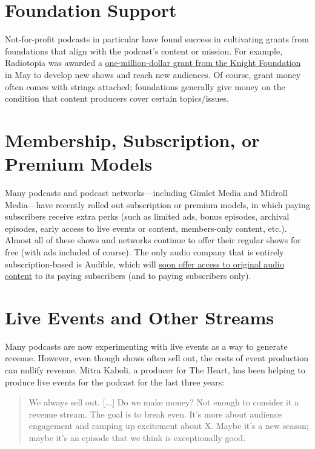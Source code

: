 \documentclass[notoc, symmetric, nobib, nols]{towcenter-guideto-book}
\begin{document}
\section{Foundation Support}
Not-for-profit podcasts in particular have found success in cultivating grants from foundations that align with the podcast's content or mission. For example, Radiotopia was awarded a \href{http://www.niemanlab.org/2015/05/knight-foundation-invests-1-million-in-creator-driven-podcast-collective-radiotopia/}{one-million-dollar grant from the Knight Foundation} in May to develop new shows and reach new audiences.\autocite{million} Of course, grant money often comes with strings attached; foundations generally give money on the condition that content producers cover certain topics/issues.
 
\section{Membership, Subscription, or Premium Models}

Many podcasts and podcast networks---including Gimlet Media and Midroll Media---have recently rolled out subscription or premium models, in which paying subscribers receive extra perks (such as limited ads, bonus episodes, archival episodes, early access to live events or content, members-only content, etc.). Almost all of these shows and networks continue to offer their regular shows for free (with ads included of course). The only audio company that is entirely subscription-based is Audible, which will \href{http://www.geekwire.com/2015/amazon-makes-moves-into-original-podcasting-hires-npr-vp-of-programming/}{soon offer access to original audio content} to its paying subscribers (and to paying subscribers only).\autocite{nuzum}

\section{Live Events and Other Streams}

Many podcasts are now experimenting with live events as a way to generate revenue. However, even though shows often sell out, the costs of event production can nullify revenue. Mitra Kaboli, a producer for The Heart, has been helping to produce live events for the podcast for the last three years: 

\begin{quote}
We always sell out. [...] Do we make money? Not enough to consider it a revenue stream. The goal is to break even. It's more about audience engagement and ramping up excitement about X. Maybe it's a new season; maybe it's an episode that we think is exceptionally good.\autocite{heart} 
\end{quote}
\end{document}
